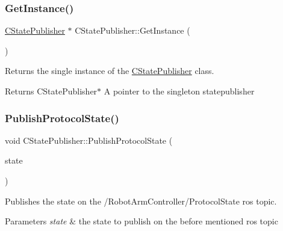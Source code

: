 \subsubsection{\texorpdfstring{Get\+Instance()}{GetInstance()}}
{\footnotesize\ttfamily \hyperlink{classCStatePublisher}{C\+State\+Publisher} $\ast$ C\+State\+Publisher\+::\+Get\+Instance (\begin{DoxyParamCaption}{ }\end{DoxyParamCaption})\hspace{0.3cm}{\ttfamily [static]}}



Returns the single instance of the \hyperlink{classCStatePublisher}{C\+State\+Publisher} class. 

\begin{DoxyReturn}{Returns}
C\+State\+Publisher$\ast$ A pointer to the singleton statepublisher 
\end{DoxyReturn}
\mbox{\label{classCStatePublisher_a0c6cde04f7712e68951bd50391c1f53e}} 
\subsubsection{\texorpdfstring{Publish\+Protocol\+State()}{PublishProtocolState()}}
{\footnotesize\ttfamily void C\+State\+Publisher\+::\+Publish\+Protocol\+State (\begin{DoxyParamCaption}\item[{\hyperlink{CStatePublisher_8h_a57ce604a7850ac5988b6182daf162fe9}{e\+Publishable\+States}}]{state }\end{DoxyParamCaption})}



Publishes the state on the /\+Robot\+Arm\+Controller/\+Protocol\+State ros topic. 


\begin{DoxyParams}{Parameters}
{\em state} & the state to publish on the before mentioned ros topic \\
\hline
\end{DoxyParams}
\mbox{\label{classCStatePublisher_af7144175e8b6e553a182ef660f37616c}} 
